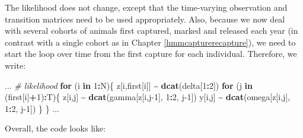 \documentclass[
  12pt,
]{krantz}
\newenvironment{Shaded}{\begin{snugshade}}{\end{snugshade}}
\newcommand{\CommentTok}[1]{\textcolor[rgb]{0.56,0.35,0.01}{\textit{#1}}}
\newcommand{\ControlFlowTok}[1]{\textcolor[rgb]{0.13,0.29,0.53}{\textbf{#1}}}
\newcommand{\DecValTok}[1]{\textcolor[rgb]{0.00,0.00,0.81}{#1}}
\newcommand{\FunctionTok}[1]{\textcolor[rgb]{0.13,0.29,0.53}{\textbf{#1}}}
\newcommand{\NormalTok}[1]{#1}
\newcommand{\SpecialCharTok}[1]{\textcolor[rgb]{0.81,0.36,0.00}{\textbf{#1}}}
\begin{document}
The likelihood does not change, except that the time-varying observation and transition matrices need to be used appropriately. Also, because we now deal with several cohorts of animals first captured, marked and released each year (in contrast with a single cohort as in Chapter \ref{hmmcapturerecapture}), we need to start the loop over time from the first capture for each individual. Therefore, we write:

\begin{Shaded}
\begin{Highlighting}[]
\NormalTok{...}
\CommentTok{\# likelihood}
  \ControlFlowTok{for}\NormalTok{ (i }\ControlFlowTok{in} \DecValTok{1}\SpecialCharTok{:}\NormalTok{N)\{}
\NormalTok{    z[i,first[i]] }\SpecialCharTok{\textasciitilde{}} \FunctionTok{dcat}\NormalTok{(delta[}\DecValTok{1}\SpecialCharTok{:}\DecValTok{2}\NormalTok{])}
    \ControlFlowTok{for}\NormalTok{ (j }\ControlFlowTok{in}\NormalTok{ (first[i]}\SpecialCharTok{+}\DecValTok{1}\NormalTok{)}\SpecialCharTok{:}\NormalTok{T)\{}
\NormalTok{      z[i,j] }\SpecialCharTok{\textasciitilde{}} \FunctionTok{dcat}\NormalTok{(gamma[z[i,j}\DecValTok{{-}1}\NormalTok{], }\DecValTok{1}\SpecialCharTok{:}\DecValTok{2}\NormalTok{, j}\DecValTok{{-}1}\NormalTok{])}
\NormalTok{      y[i,j] }\SpecialCharTok{\textasciitilde{}} \FunctionTok{dcat}\NormalTok{(omega[z[i,j], }\DecValTok{1}\SpecialCharTok{:}\DecValTok{2}\NormalTok{, j}\DecValTok{{-}1}\NormalTok{])}
\NormalTok{    \}}
\NormalTok{  \}}
\NormalTok{...}
\end{Highlighting}
\end{Shaded}

Overall, the code looks like:
\end{document}
